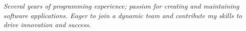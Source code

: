 
\begin{cvparagraph}
\textit{Several years of programming experience; passion for creating and maintaining software applications. Eager to join a dynamic team and contribute my skills to drive innovation and success.}
\end{cvparagraph}
